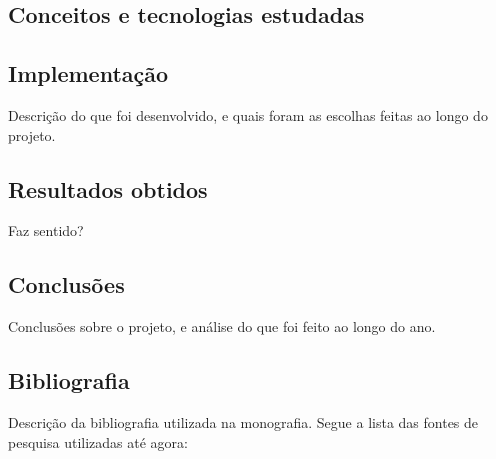 \documentclass[titlepage]{article}
\begin{document}
\subsection{Conceitos e tecnologias estudadas}

\subsection{Implementação}
Descrição do que foi desenvolvido, e quais foram as escolhas feitas ao longo do projeto.

\subsection{Resultados obtidos}
Faz sentido?

\subsection{Conclusões}
Conclusões sobre o projeto, e análise do que foi feito ao longo do ano.

\subsection{Bibliografia}
Descrição da bibliografia utilizada na monografia. Segue a lista das fontes de pesquisa utilizadas até agora:
\end{document}
